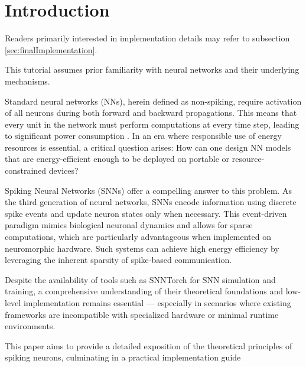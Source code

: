 \section*{Introduction}
	\label{introduction}
	
	\par Readers primarily interested in implementation details may refer to subsection \ref{sec:finalImplementation}.\newline
	
	\par This tutorial assumes prior familiarity with neural networks and their underlying mechanisms.
	
	\par Standard neural networks (NNs), herein defined as non-spiking, require activation of all neurons during both forward and backward propagations. This means that every unit in the network must perform computations at every time step, leading to significant power consumption \cite{10242251}. In an era where responsible use of energy resources is essential, a critical question arises: How can one design NN models that are energy-efficient enough to be deployed on portable or resource-constrained devices?
	
	\par Spiking Neural Networks (SNNs) offer a compelling answer to this problem. As the third generation of neural networks, SNNs encode information using discrete spike events and update neuron states only when necessary. This event-driven paradigm mimics biological neuronal dynamics and allows for sparse computations, which are particularly advantageous when implemented on neuromorphic hardware. Such systems can achieve high energy efficiency by leveraging the inherent sparsity of spike-based communication.
	
	\par Despite the availability of tools such as SNNTorch for SNN simulation and training, a comprehensive understanding of their theoretical foundations and low-level implementation remains essential — especially in scenarios where existing frameworks are incompatible with specialized hardware or minimal runtime environments.
	
	\par This paper aims to provide a detailed exposition of the theoretical principles of spiking neurons, culminating in a practical implementation guide